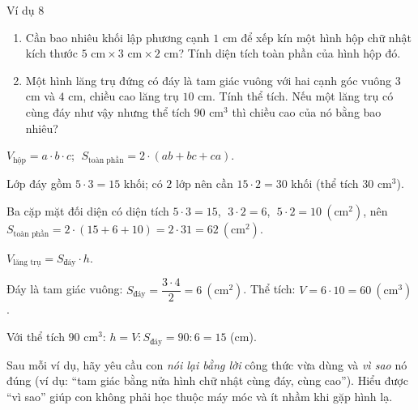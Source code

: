\begin{exbox}{Ví dụ 8}
\begin{enumerate}[label=\alph*),leftmargin=1.6em,itemsep=0pt,topsep=2pt]
  \item Cần bao nhiêu khối lập phương cạnh $1$ cm để xếp kín một hình hộp chữ nhật kích thước $5\text{ cm}\times3\text{ cm}\times2\text{ cm}$? Tính diện tích toàn phần của hình hộp đó.
  \item Một hình lăng trụ đứng có đáy là tam giác vuông với hai cạnh góc vuông $3$ cm và $4$ cm, chiều cao lăng trụ $10$ cm. Tính thể tích. Nếu một lăng trụ có cùng đáy như vậy nhưng thể tích $90\text{ cm}^3$ thì chiều cao của nó bằng bao nhiêu?
\end{enumerate}
\guide
{}
\begin{recallbox}$V_{\text{hộp}}=a\cdot b\cdot c$; $\;S_{\text{toàn phần}}=2\cdot(ab+bc+ca)$.\end{recallbox}
Lớp đáy gồm $5\cdot3=15$ khối; có $2$ lớp nên cần $15\cdot2=30$ khối (thể tích $30\text{ cm}^3$).

Ba cặp mặt đối diện có diện tích $5\cdot3=15$, $\;3\cdot2=6$, $\;5\cdot2=10\ (\text{cm}^2)$, nên
$S_{\text{toàn phần}}=2\cdot(15+6+10)=2\cdot31=62\ (\text{cm}^2)$.

\begin{recallbox}$V_{\text{lăng trụ}}=S_{\text{đáy}}\cdot h$.\end{recallbox}
Đáy là tam giác vuông: $S_{\text{đáy}}=\dfrac{3\cdot4}{2}=6\ (\text{cm}^2)$. Thể tích: $V=6\cdot10=60\ (\text{cm}^3)$.

Với thể tích $90\text{ cm}^3$: $h=V:S_{\text{đáy}}=90:6=15$ (cm).
\end{exbox}

\begin{parentbox}
Sau mỗi ví dụ, hãy yêu cầu con \emph{nói lại bằng lời} công thức vừa dùng và \emph{vì sao} nó đúng (ví dụ: ``tam giác bằng nửa hình chữ nhật cùng đáy, cùng cao''). Hiểu được ``vì sao'' giúp con không phải học thuộc máy móc và ít nhầm khi gặp hình lạ.
\end{parentbox}

\clearpage
{}

